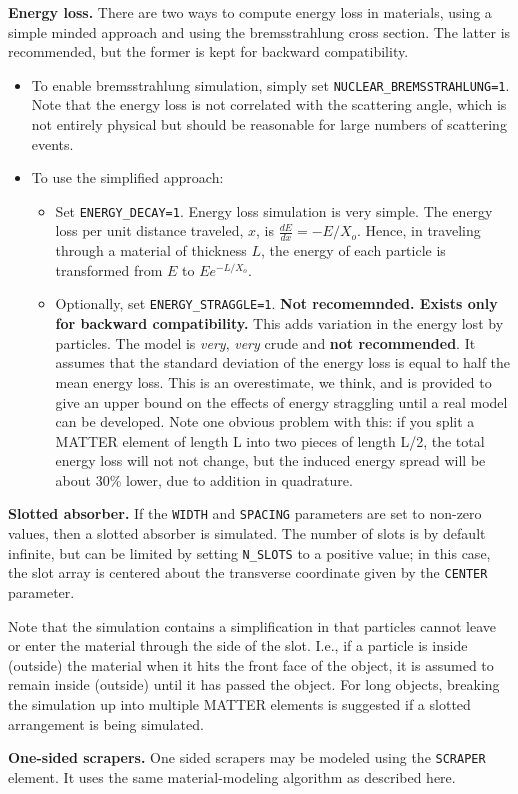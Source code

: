 {\bf Energy loss.} There are two ways to compute energy loss in materials, using a simple minded approach and using the bremsstrahlung cross section.
The latter is recommended, but the former is kept for backward compatibility. 
\begin{itemize}
\item To enable bremsstrahlung simulation, simply set \verb|NUCLEAR_BREMSSTRAHLUNG=1|. Note that the energy loss is not correlated with the scattering
  angle, which is not entirely physical but should be reasonable for large numbers of scattering events.
\item To use the simplified approach:
      \begin{itemize}
      \item  Set \verb|ENERGY_DECAY=1|. Energy loss simulation is very simple.
The energy loss per unit distance traveled, $x$, is 
$\frac{dE}{dx} = -E/X_o$.  Hence, in traveling through a
material of thickness $L$, the energy of each particle is
transformed from $E$ to $E e^{-L/X_o}$.  
       \item Optionally, set \verb|ENERGY_STRAGGLE=1|. {\bf Not recomemnded. Exists only for backward compatibility.}
This adds variation in the energy lost
by particles.  The model is {\em very}, {\em very} crude and {\bf not recommended}.  It assumes that the standard deviation of the energy
loss is equal to half the mean energy loss.  This is an overestimate,
we think, and is provided to give an upper bound on the effects of
energy straggling until a real model can be developed.  Note one
obvious problem with this: if you split a MATTER element of length L
into two pieces of length L/2, the total energy loss will not not
change, but the induced energy spread will be about 30\% lower, due to
addition in quadrature.
\end{itemize}
\end{itemize}

{\bf Slotted absorber.} If the \verb|WIDTH| and \verb|SPACING| parameters are set to non-zero values, then a 
slotted absorber is simulated. The number of slots is by default infinite, but can be limited by setting
\verb|N_SLOTS| to a positive value; in this case, the slot array is centered about the transverse coordinate
given by the \verb|CENTER| parameter.

Note that the simulation contains a simplification in that particles cannot leave or enter the material
through the side of the slot. I.e., if a particle is inside (outside) the material when it hits the
front face of the object, it is assumed to remain inside (outside) until it has passed the object.
For long objects, breaking the simulation up into multiple MATTER elements is suggested if
a slotted arrangement is being simulated.

{\bf One-sided scrapers.} One sided scrapers may be modeled using the \verb|SCRAPER| element.
It uses the same material-modeling algorithm as described here.
